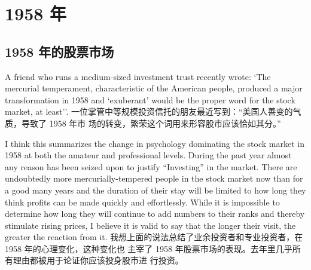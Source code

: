 \chapter{1958 年}

\section{1958 年的股票市场}

\begin{verseparallel}
  {
    \noindent A friend who runs a medium-sized investment trust recently wrote:
    `The mercurial temperament, characteristic of the American people, produced
    a major transformation in 1958 and ‘exuberant’ would be the proper word
    for the stock market, at least''.
  }
  {
    一位掌管中等规模投资信托的朋友最近写到：“美国人善变的气质，导致了 1958 年市
    场的转变，繁荣这个词用来形容股市应该恰如其分。”
  }
\end{verseparallel}

\begin{verseparallel}
  {
    I think this summarizes the change in psychology dominating the stock market in 1958 at both the amateur and
    professional levels. During the past year almost any reason has been seized upon to justify “Investing” in the
    market. There are undoubtedly more mercurially-tempered people in the stock market now than for a good many
    years and the duration of their stay will be limited to how long they think profits can be made quickly and
    effortlessly. While it is impossible to determine how long they will continue to add numbers to their ranks and
    thereby stimulate rising prices, I believe it is valid to say that the longer their visit, the greater the reaction from
    it.
  }
  {
    我想上面的说法总结了业余投资者和专业投资者，在 1958 年的心理变化，这种变化也
    主宰了 1958 年股票市场的表现。去年里几乎所有理由都被用于论证你应该投身股市进
    行投资。
  }
\end{verseparallel}


